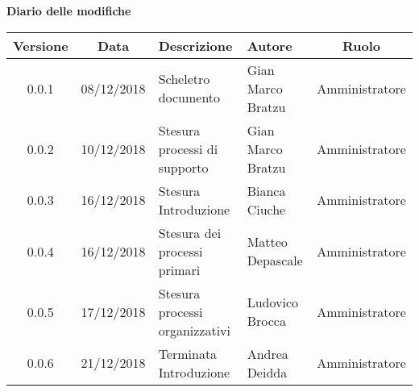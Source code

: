 	\begin{center}
		\textbf{Diario delle modifiche}
	\end{center}
	\begin{center}
		\begin{tabularx}{\textwidth}{|c|c|X|X|c|}
			\hline
			\textbf{Versione} & \textbf{Data} & \textbf{Descrizione} & \textbf{Autore} & \textbf{Ruolo} \\
			\hline
			0.0.1 & 08/12/2018 & Scheletro documento  & Gian Marco Bratzu & Amministratore\\
			\hline
			0.0.2 & 10/12/2018 & Stesura processi di supporto & Gian Marco Bratzu & Amministratore\\	
			\hline
			0.0.3 & 16/12/2018 & Stesura Introduzione & Bianca Ciuche & Amministratore\\
			\hline
			0.0.4 & 16/12/2018 & Stesura dei processi primari & Matteo Depascale & Amministratore\\
			\hline
			0.0.5 & 17/12/2018 & Stesura processi organizzativi & Ludovico Brocca & Amministratore\\
			\hline
			0.0.6 & 21/12/2018 & Terminata Introduzione & Andrea Deidda & Amministratore\\
			\hline
		\end{tabularx}
	\end{center}

\newpage